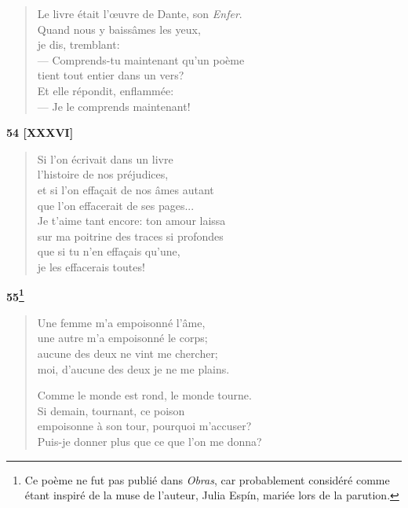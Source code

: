 
\begin{verse}
  Le livre était l'œuvre de Dante,
  son \emph{Enfer}. \\
  Quand nous y baissâmes les yeux, \\
  je dis, tremblant: \\
  --- Comprends-tu maintenant qu'un poème \\
    tient tout entier dans un vers? \\
  Et elle répondit, enflammée: \\
  --- Je le comprends maintenant!
\end{verse}


\begin{center}
  \textbf{54 [XXXVI]}
\end{center}

\vspace*{-15pt}

\begin{verse}
  Si l'on écrivait dans un livre \\
  l'histoire de nos préjudices, \\
  et si l'on effaçait de nos âmes autant \\
  que l'on effacerait de ses pages... \\
  Je t'aime tant encore: ton amour laissa \\
  sur ma poitrine des traces si profondes \\
  que si tu n'en effaçais qu'une, \\
  je les effacerais toutes!
\end{verse}


\begin{center}
  \textbf{55\footnote{Ce poème ne fut pas publié dans \emph{Obras},
    car probablement considéré comme étant inspiré de la muse
    de l'auteur, Julia Espín, mariée lors de la parution.}}
\end{center}

\vspace*{-15pt}

\begin{verse}
  Une femme m'a empoisonné l'âme, \\
  une autre m'a empoisonné le corps; \\
  aucune des deux ne vint me chercher; \\
  moi, d'aucune des deux je ne me plains.

  Comme le monde est rond, le monde tourne. \\
  Si demain, tournant, ce poison \\
  empoisonne à son tour, pourquoi m'accuser? \\
  Puis-je donner plus que ce que l'on me donna?
\end{verse}

